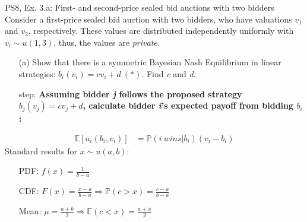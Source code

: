 \begin{frame}{PS8, Ex. 3.a: First- and second-price sealed bid auctions with two bidders}
    Consider a first-price sealed bid auction with two bidders, who have valuations $v_1$ and $v_2$, respectively. These values are distributed independently uniformly with $v_i\sim u(1,3)$, thus, the values are \textit{private}.
    \vspace{-4pt}
    \begin{itemize}
      \item[(a)] Show that there is a symmetric Bayesian Nash Equilibrium in linear strategies: $b_i(v_i) = cv_i + d\ (*)$. Find \textit{c} and \textit{d}.
    \end{itemize}
    \vspace{-8pt}
    \begin{multicols}{2}
      \begin{itemize}
        \item[\nth{1} step:] \textbf{Assuming bidder \textit{j} follows the proposed strategy $b_j(v_j) = cv_j + d$, calculate bidder \textit{i}'s expected payoff from bidding $b_i$:}
      \end{itemize}
      \vspace{-4pt}
      \begin{align*}
        \mathbb{E}[u_i(b_i,v_i)]&=\mathbb{P}(i\ wins|b_i)(v_i-b_i)
      \end{align*}
      \vfill\null\columnbreak
      Standard results for $x\sim u(a, b):$
      \vspace{-6pt}
      \begin{enumerate}
        \item[PDF:] $f(x)=\frac{1}{b-a}$
        \item[CDF:] $F(x)=\frac{x-a}{b-a}\Rightarrow\mathbb{P}(c>x)=\frac{c-a}{b-a}$
        \item[Mean:] $\mu=\frac{a+b}{2}\Rightarrow\mathbb{E}(c<x)=\frac{a+x}{2}$
      \end{enumerate}
      \vfill\null
    \end{multicols}
\end{frame}

